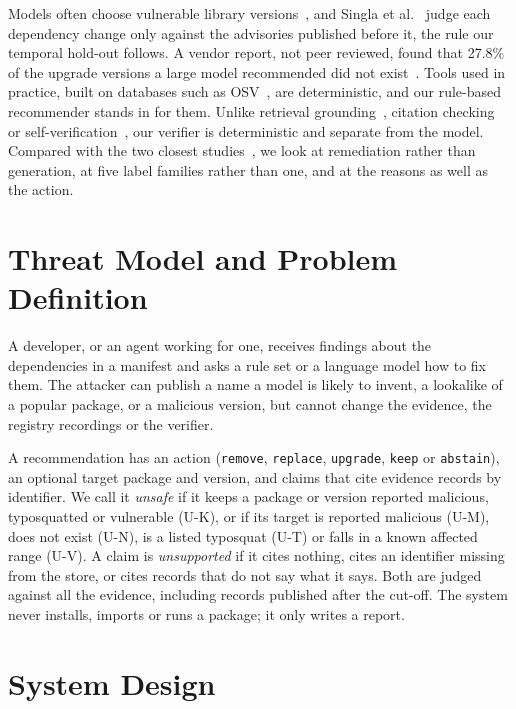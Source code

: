 \documentclass[conference]{IEEEtran}
\begin{document}
Models often choose vulnerable library versions~\cite{wang2026}, and Singla et al.~\cite{singla2026} judge each
dependency change only against the advisories published before it, the rule our temporal hold-out follows. A vendor
report, not peer reviewed, found that 27.8\% of the upgrade versions a large model recommended did not
exist~\cite{sonatype2026}. Tools used in practice, built on databases such as OSV~\cite{osv}, are deterministic, and
our rule-based recommender stands in for them. Unlike retrieval grounding~\cite{lewis2020}, citation
checking~\cite{gao2023} or self-verification~\cite{dhuliawala2024}, our verifier is deterministic and separate from
the model. Compared with the two closest studies~\cite{spracklen2025,singla2026}, we look at remediation rather
than generation, at five label families rather than one, and at the reasons as well as the action.

\section{Threat Model and Problem Definition}
\label{sec:threat}

A developer, or an agent working for one, receives findings about the dependencies in a manifest and asks a rule
set or a language model how to fix them. The attacker can publish a name a model is likely to invent, a lookalike of a popular
package, or a malicious version, but cannot change the evidence, the registry recordings or the verifier.

A recommendation has an action (\texttt{remove}, \texttt{replace}, \texttt{upgrade}, \texttt{keep} or
\texttt{abstain}), an optional target package and version, and claims that cite evidence records by identifier. We
call it \emph{unsafe} if it keeps a package or version reported malicious, typosquatted or vulnerable (U-K), or if
its target is reported malicious (U-M), does not exist (U-N), is a listed typosquat (U-T) or falls in a known
affected range (U-V). A claim is \emph{unsupported} if it cites nothing, cites an identifier missing from the store,
or cites records that do not say what it says. Both are judged against all the evidence, including records
published after the cut-off. The system never installs, imports or runs a package; it only writes a report.

\section{System Design}
\label{sec:system}
\end{document}

